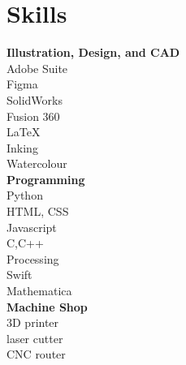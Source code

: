 \documentclass[10pt]{article} %
\begin{document}
\hspace{0.5cm}
\begin{minipage}[t]{0.2\textwidth}
  \section*{Skills}
  \textbf{Illustration, Design, and CAD}\\
  Adobe Suite\\
  Figma\\
  SolidWorks\\
  Fusion 360\\
  LaTeX\\
  Inking\\
  Watercolour\\

  \textbf{Programming}\\
  Python\\
  HTML, CSS\\
  Javascript\\
  C,C++\\
  Processing\\ Swift \\
  Mathematica\\
  

  \textbf{Machine Shop}\\
  3D printer\\ laser cutter\\ CNC router\\
\end{minipage}
\end{document}
